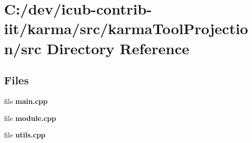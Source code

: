 \section{C\+:/dev/icub-\/contrib-\/iit/karma/src/karma\+Tool\+Projection/src Directory Reference}
\label{dir_fc03fb402f9f2a4202506acbbf0a4b9a}
\subsection*{Files}
\begin{DoxyCompactItemize}
\item 
file {\bfseries main.\+cpp}
\item 
file {\bfseries module.\+cpp}
\item 
file {\bfseries utils.\+cpp}
\end{DoxyCompactItemize}
